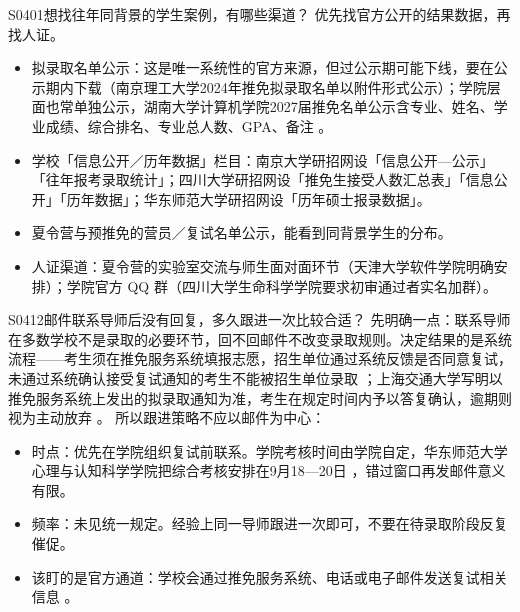 \begin{qa}{S0401}{想找往年同背景的学生案例，有哪些渠道？}
优先找官方公开的结果数据，再找人证。
\begin{itemize}
  \item 拟录取名单公示：这是唯一系统性的官方来源，但过公示期可能下线，要在公示期内下载（南京理工大学2024年推免拟录取名单以附件形式公示）；学院层面也常单独公示，湖南大学计算机学院2027届推免名单公示含专业、姓名、学业成绩、综合排名、专业总人数、GPA、备注 。
  \item 学校「信息公开／历年数据」栏目：南京大学研招网设「信息公开—公示」「往年报考录取统计」；四川大学研招网设「推免生接受人数汇总表」「信息公开」「历年数据」；华东师范大学研招网设「历年硕士报录数据」。
  \item 夏令营与预推免的营员／复试名单公示，能看到同背景学生的分布。
  \item 人证渠道：夏令营的实验室交流与师生面对面环节（天津大学软件学院明确安排）；学院官方 QQ 群（四川大学生命科学学院要求初审通过者实名加群）。
\end{itemize}
\end{qa}

\begin{qa}{S0412}{邮件联系导师后没有回复，多久跟进一次比较合适？}
先明确一点：联系导师在多数学校不是录取的必要环节，回不回邮件不改变录取规则。决定结果的是系统流程——考生须在推免服务系统填报志愿，招生单位通过系统反馈是否同意复试，未通过系统确认接受复试通知的考生不能被招生单位录取 ；上海交通大学写明以推免服务系统上发出的拟录取通知为准，考生在规定时间内予以答复确认，逾期则视为主动放弃 。
所以跟进策略不应以邮件为中心：
\begin{itemize}
  \item 时点：优先在学院组织复试前联系。学院考核时间由学院自定，华东师范大学心理与认知科学学院把综合考核安排在9月18—20日 ，错过窗口再发邮件意义有限。
  \item 频率：未见统一规定。经验上同一导师跟进一次即可，不要在待录取阶段反复催促。
  \item 该盯的是官方通道：学校会通过推免服务系统、电话或电子邮件发送复试相关信息 。
\end{itemize}
\end{qa}

